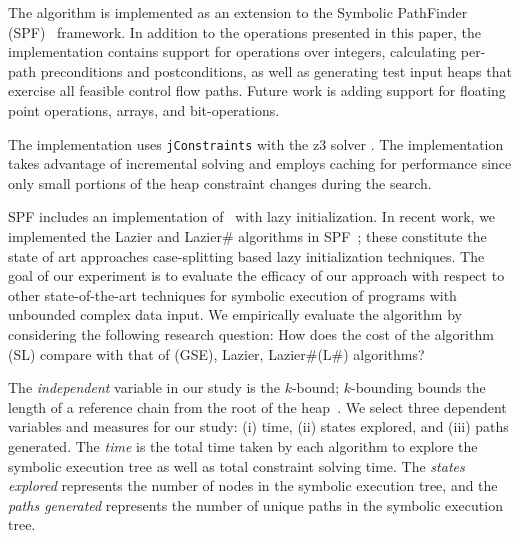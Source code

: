 
The \symtxt{} algorithm is implemented as an extension to the Symbolic
PathFinder (SPF)~\cite{DBLP:journals/ase/PasareanuVBGMR13}
framework. In addition to the operations presented in this paper, the
implementation contains support for operations over integers,
calculating per-path preconditions and postconditions, as well as
generating test input heaps that exercise all feasible control flow
paths. Future work is adding support for floating point
operations, arrays, and bit-operations.

The \symtxt{} implementation uses \texttt{jConstraints} with the z3 solver \cite{ase2014-ghilrr,jpf2014-dghirr,deMouraBjorner08Z3}. The implementation takes advantage of incremental solving and employs caching for performance since only small portions of the heap constraint changes during the search.

SPF includes an implementation of~\gsetxt{} with lazy initialization.
In recent work, we implemented the Lazier and Lazier\# algorithms in
SPF~\cite{Hillery:2014}; these constitute the state of art approaches
case-splitting based lazy initialization techniques. The goal of our
experiment is to evaluate the efficacy of our approach with respect to
other state-of-the-art techniques for symbolic execution of programs
with unbounded complex data input. We empirically evaluate the
\symtxt{} algorithm by considering the following research question:
How does the cost of the \symtxt{} algorithm (SL) compare with that of
\gsetxt{} (GSE), Lazier, Lazier\#(L\#) algorithms?

The \emph{independent} variable in our study is the $k$-bound;
$k$-bounding bounds the length of a reference chain from the root of
the heap~\cite{Kiasan06}.  We select three dependent variables and
measures for our study: (i) time, (ii) states explored, and (iii)
paths generated. The \emph{time} is the total time taken by each
algorithm to explore the symbolic execution tree as well as total
constraint solving time. The \emph{states explored} represents the
number of nodes in the symbolic execution tree, and the \emph{paths
  generated} represents the number of unique paths in the symbolic
execution tree.


